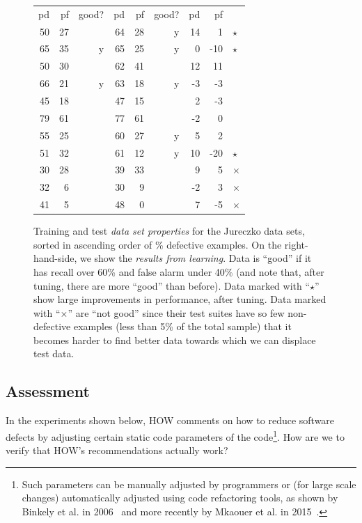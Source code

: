 \documentclass[conference]{IEEEtran}
\begin{document}
\begin{figure}[!t]
\begin{center}
\begin{minipage}{.4\linewidth}
\begin{tabular}{|rrr|rrr|rr|l}
  pd & pf & good? & pd & pf & good? & pd & pf\\\cline{1-8}
  50 & 27 &   & 64 & 28 & y & 14 & 1&$\star$\\
  65 & 35 & y & 65 & 25 & y & 0 & -10&$\star$\\
  50 & 30 &   & 62 & 41 &   & 12 & 11\\
  66 & 21 & y & 63 & 18 & y & -3 & -3\\
  45 & 18 &   & 47 & 15 &   & 2 & -3\\
  79 & 61 &   & 77 & 61 &   & -2 & 0\\
  55 & 25 &   & 60 & 27 & y & 5 & 2\\
  51 & 32 &   & 61 & 12 & y & 10 & -20&$\star$\\
 30 & 28 &   & 39 & 33 &   & 9 & 5&$\times$\\
  32 & 6 &   & 30 & 9 &   & -2 & 3&$\times$\\
  41 & 5 &   & 48 & 0 &   & 7 & -5&$\times$\\
\hline 
\end{tabular}

\end{minipage}
\end{center}    
  
    \caption{Training and test {\em data set properties} for the Jureczko data sets,
    sorted in ascending order of \% defective examples.
    On the right-hand-side, we show the {\em results from learning}.
    Data is ``good'' if it has recall over 60\% and false alarm under 40\%
(and note that, after tuning, there are more ``good'' than before).
Data   marked with ``$\star$'' show large improvements in performance, after tuning.
Data   marked with ``$\times$'' are ``not good'' since their test suites  have so few non-defective examples (less than 5\% of the total sample) that it becomes harder to find better data towards which we can displace test data.
}\label{fig:j}
\end{figure}




\subsection{Assessment}\label{sect:assess}
In the experiments shown below,  HOW comments  on how to reduce
software defects by adjusting certain static code parameters of the code\footnote{Such parameters can be manually adjusted by programmers or (for large scale changes) automatically adjusted using code refactoring
tools, as shown by Binkely et al. in 2006~\cite{Binkley2006} and more recently by Mkaouer et al. in 2015~\cite{Mkaouer15}.}. How are we to verify that HOW's recommendations actually work? 
\end{document}

